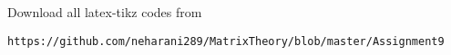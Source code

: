\documentclass[journal,12pt,twocolumn]{IEEEtran}
\begin{document}
% 
\maketitle
\newpage
\bigskip
\renewcommand{\thefigure}{\theenumi}
\renewcommand{\thetable}{\theenumi}
%
%
%
%
Download all latex-tikz codes from 
%
\begin{lstlisting}
https://github.com/neharani289/MatrixTheory/blob/master/Assignment9
\end{lstlisting}
%
\end{document}
